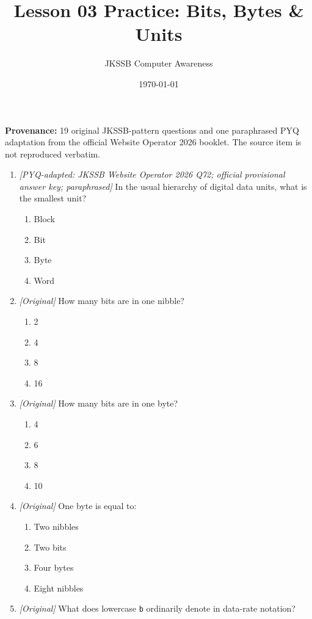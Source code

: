 \documentclass[11pt]{article}
\title{Lesson 03 Practice: Bits, Bytes \& Units}
\author{JKSSB Computer Awareness}
\date{\today}
\begin{document}
\maketitle
\noindent\textbf{Provenance:} 19 original JKSSB-pattern questions and one
paraphrased PYQ adaptation from the official Website Operator 2026 booklet.
The source item is not reproduced verbatim.

\begin{enumerate}[label=\textbf{Q\arabic*.}, leftmargin=*]
\item \textit{[PYQ-adapted: JKSSB Website Operator 2026 Q72; official
provisional answer key; paraphrased]} In the usual hierarchy of digital data
units, what is the smallest unit?
  \begin{enumerate}[label=\Alph*.]
    \item Block
    \item Bit
    \item Byte
    \item Word
  \end{enumerate}
\item \textit{[Original]} How many bits are in one nibble?
  \begin{enumerate}[label=\Alph*.]
    \item 2
    \item 4
    \item 8
    \item 16
  \end{enumerate}
\item \textit{[Original]} How many bits are in one byte?
  \begin{enumerate}[label=\Alph*.]
    \item 4
    \item 6
    \item 8
    \item 10
  \end{enumerate}
\item \textit{[Original]} One byte is equal to:
  \begin{enumerate}[label=\Alph*.]
    \item Two nibbles
    \item Two bits
    \item Four bytes
    \item Eight nibbles
  \end{enumerate}
\item \textit{[Original]} What does lowercase \texttt{b} ordinarily denote in
  data-rate notation?
  \begin{enumerate}[label=\Alph*.]

\end{enumerate}
\end{enumerate}
\end{document}
